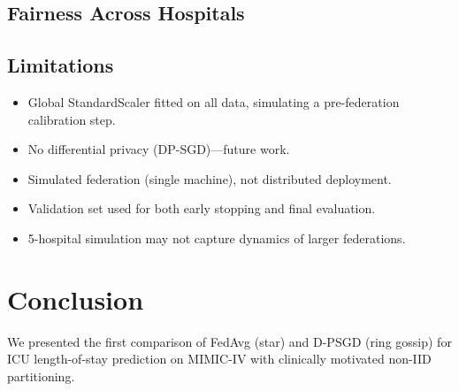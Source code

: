 \documentclass[conference]{IEEEtran}
\begin{document}

\subsection{Fairness Across Hospitals}


\subsection{Limitations}

\begin{itemize}
    \item Global StandardScaler fitted on all data, simulating a pre-federation calibration step.
    \item No differential privacy (DP-SGD)---future work.
    \item Simulated federation (single machine), not distributed deployment.
    \item Validation set used for both early stopping and final evaluation.
    \item 5-hospital simulation may not capture dynamics of larger federations.
\end{itemize}


\section{Conclusion}
\label{sec:conclusion}


We presented the first comparison of FedAvg (star) and D-PSGD (ring gossip) for ICU length-of-stay prediction on MIMIC-IV with clinically motivated non-IID partitioning.





\end{document}
